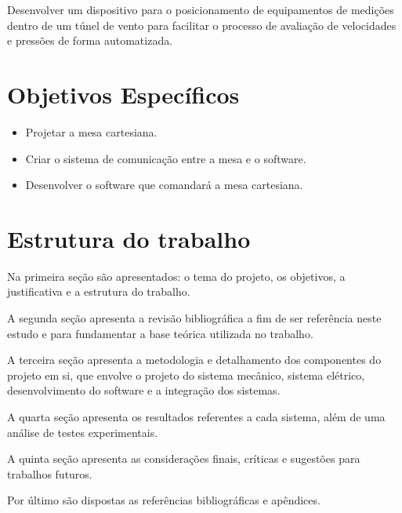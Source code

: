 Desenvolver um dispositivo para o posicionamento de equipamentos de medições dentro de um túnel de vento para 
facilitar o processo de avaliação de velocidades e pressões de forma automatizada.

\section{Objetivos Específicos}\label{sec:objetivoesp}

	\begin{itemize}
		\item Projetar a mesa cartesiana.
		\item Criar o sistema de comunicação entre a mesa e o software.
		\item Desenvolver o software que comandará a mesa cartesiana.
	\end{itemize}

\section{Estrutura do trabalho}\label{sec:estruturatrab}

Na primeira seção são apresentados: o tema do projeto, os objetivos, 
a justificativa e a estrutura do trabalho.

A segunda seção apresenta a revisão bibliográfica a fim de ser referência neste estudo e para fundamentar 
a base teórica utilizada no trabalho.

A terceira seção apresenta a metodologia e detalhamento dos componentes do projeto em si, 
que envolve o projeto do sistema mecânico, sistema elétrico, desenvolvimento do software 
e a integração dos sistemas.

A quarta seção apresenta os resultados referentes a cada sistema, além de uma análise de testes experimentais.

A quinta seção apresenta as considerações finais, críticas e sugestões para trabalhos futuros.

Por último são dispostas as referências bibliográficas e apêndices.